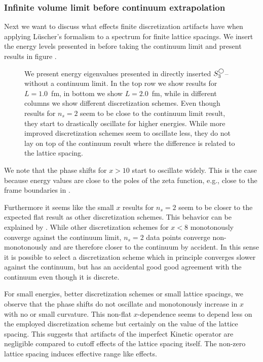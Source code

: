 \subsubsection{Infinite volume limit before continuum extrapolation}
Next we want to discuss what effects finite discretization artifacts have when applying L\"uscher's formalism to a spectrum for finite lattice spacings.
We insert the energy levels presented in  before taking the continuum limit and present results in figure .

\begin{figure}[th]
    \scalebox{0.9}{}
    \caption{
        \label{fig:unimproved spherical}
        We present energy eigenvalues presented in  directly inserted $S^{\bigcirc}_3$--without a continuum limit.
        In the top row we show results for $L=1.0$~fm, in bottom we show $L=2.0$~fm, while in different columns we show different discretization schemes.
        Even though results for $n_s = 2$ seem to be close to the continuum limit result, they start to drastically oscillate for higher energies.
        While more improved discretization schemes seem to oscillate less, they do not lay on top of the continuum result where the difference is related to the lattice spacing.
    }
\end{figure}

We note that the phase shifts for $x > 10$ start to oscillate widely.
This is the case because energy values are close to the poles of the zeta function, e.g., close to the frame boundaries in .

Furthermore it seems like the small $x$ results for $n_s = 2$ seem to be closer to the expected flat result as other discretization schemes.
This behavior can be explained by .
While other discretization schemes for $x < 8$ monotonously converge against the continuum limit, $n_s = 2$ data points converge non-monotonously and are therefore closer to the continuum by accident.
In this sense it is possible to select a discretization scheme which in principle converges slower against the continuum, but has an accidental good good agreement with the continuum even though it is discrete.

For small energies, better discretization schemes or small lattice spacings, we observe that the phase shifts do not oscillate and monotonously increase in $x$ with no or small curvature.
This non-flat $x$-dependence seems to depend less on the employed discretization scheme but certainly on the value of the lattice spacing.
This suggests that artifacts of the imperfect Kinetic operator are negligible compared to cutoff effects of the lattice spacing itself.
The non-zero lattice spacing induces effective range like effects.

